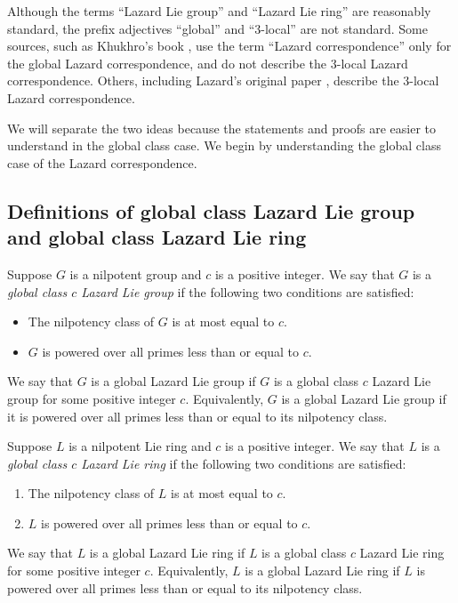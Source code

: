 \documentclass{ucetd}
\begin{document}
Although the terms ``Lazard Lie group'' and ``Lazard Lie ring'' are
reasonably standard, the prefix adjectives ``global'' and ``3-local''
are not standard. Some sources, such as Khukhro's book \cite{Khukhro},
use the term ``Lazard correspondence'' only for the global Lazard
correspondence, and do not describe the $3$-local Lazard
correspondence. Others, including Lazard's original paper
\cite{Lazardsoriginal}, describe the $3$-local Lazard correspondence.

We will separate the two ideas because the statements and proofs are
easier to understand in the global class case. We begin by
understanding the global class case of the Lazard correspondence.

\subsection{Definitions of global class Lazard Lie group and global class Lazard Lie ring}

\begin{definer}
  Suppose $G$ is a nilpotent group and $c$ is a positive integer. We
  say that $G$ is a {\em global class $c$ Lazard Lie group} if the
  following two conditions are satisfied:

  \begin{itemize}
  \item The nilpotency class of $G$ is at most equal to $c$.
  \item $G$ is powered over all primes less than or equal to $c$.
  \end{itemize}

  We say that $G$ is a global Lazard Lie group if $G$ is a global
  class $c$ Lazard Lie group for some positive integer
  $c$. Equivalently, $G$ is a global Lazard Lie group if it is powered
  over all primes less than or equal to its nilpotency class.
\end{definer}

\begin{definer}
  Suppose $L$ is a nilpotent Lie ring and $c$ is a positive
  integer. We say that $L$ is a {\em global class $c$ Lazard Lie ring}
  if the following two conditions are satisfied:

  \begin{enumerate}
  \item The nilpotency class of $L$ is at most equal to $c$.
  \item $L$ is powered over all primes less than or equal to $c$.
  \end{enumerate}

  We say that $L$ is a global Lazard Lie ring if $L$ is a global class
  $c$ Lazard Lie ring for some positive integer $c$. Equivalently, $L$
  is a global Lazard Lie ring if $L$ is powered over all primes less
  than or equal to its nilpotency class.
\end{definer}
\end{document}
